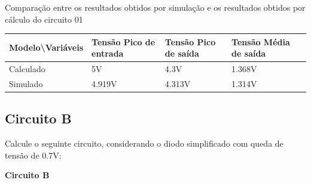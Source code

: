 \begin{quadro}[H]
    \centering
    \caption{Comparação entre os resultados obtidos por simulação e os resultados obtidos por cálculo do circuito 01}
    \begin{tabular}{|C{0.19\textwidth}|C{0.24\textwidth}|C{0.24\textwidth}|C{0.24\textwidth}|C{0.24\textwidth}|}
        \hline
        \textbf{Modelo\textbackslash{}Variáveis} & \textbf{Tensão Pico de entrada} & \textbf{Tensão Pico de saída} & \textbf{Tensão Média de saída} \\
        \hline
        Calculado & 5V & 4.3V & 1.368V \\
        \hline
        Simulado & 4.919V & 4.313V & 1.314V \\
        \hline
    \end{tabular}
    \vspace{-0.6cm}
    \label{tab:Comparacao1Circuito}
\end{quadro}

\subsection{Circuito B}

Calcule o seguinte circuito, considerando o diodo simplificado com queda de tensão de 0.7V:

\noindent
\textbf{Circuito B}

\begin{Resolucao}[H]
    \label{res:CircuitoExercicioB}
\end{Resolucao}

